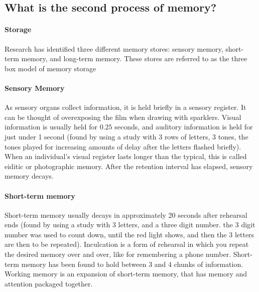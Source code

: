 \documentclass[10pt,letter]{article}
\theoremstyle{plain}
\theoremstyle{definition}
\begin{document}
\subsection*{What is the second process of memory?}
\paragraph{Storage}
Research has identified three different memory stores: sensory memory, short-term memory, and long-term memory. These stores are referred to as the three box model of memory storage 
\paragraph{Sensory Memory}
As sensory organs collect information, it is held briefly in a sensory register. It can be thought of overexposing the film when drawing with sparklers. Visual information is usually held for $0.25$ seconds, and auditory information is held for just under 1 second (found by using a study with 3 rows of letters, 3 tones, the tones played for increasing amounts of delay after the letters flashed briefly). When an individual's visual register lasts longer than the typical, this is called eiditic or photographic memory. After the retention interval has elapsed, sensory memory decays. 
\paragraph{Short-term memory}
Short-term memory usually decays in approximately 20 seconds after rehearsal ends (found by using a study with 3 letters, and a three digit number. the 3 digit number was used to count down, until the red light shows, and then the 3 letters are then to be repeated). Inculcation is a form of rehearsal in which you repeat the desired memory over and over, like for remembering a phone number. Short-term memory has been found to hold between 3 and 4 chunks of information. Working memory is an expansion of short-term memory, that has memory and attention packaged together. 
\end{document}
